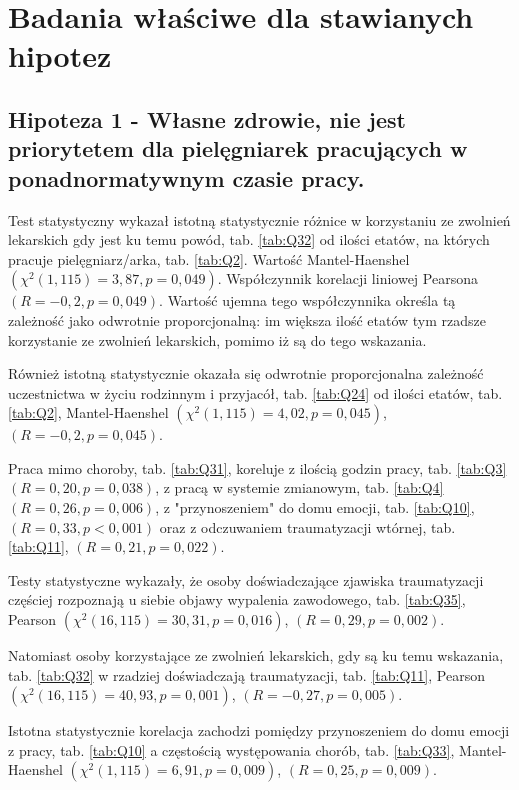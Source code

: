 \documentclass[a4paper,12pt,twoside,openright]{mwrep}
\begin{document}


\section*{Badania właściwe dla stawianych hipotez}


\subsection* {Hipoteza 1 - Własne zdrowie, nie jest priorytetem dla pielęgniarek pracujących w ponadnormatywnym czasie pracy.}


Test statystyczny wykazał istotną statystycznie różnice w korzystaniu ze zwolnień lekarskich gdy jest ku temu powód, tab. \ref{tab:Q32} od ilości etatów,  na których pracuje pielęgniarz/arka, tab. \ref{tab:Q2}. Wartość Mantel-Haenshel $(\chi^2 (1, 115) = 3,87, p=0,049)$. Współczynnik korelacji liniowej Pearsona $(R = -0,2, p=0,049)$. Wartość ujemna tego współczynnika określa tą zależność jako odwrotnie proporcjonalną: im większa ilość etatów tym rzadsze korzystanie ze zwolnień lekarskich, pomimo iż są do tego wskazania.

Również istotną statystycznie okazała się odwrotnie proporcjonalna zależność uczestnictwa w życiu rodzinnym i przyjacół, tab. \ref{tab:Q24} od ilości etatów, tab. \ref{tab:Q2}, Mantel-Haenshel $(\chi^2 (1, 115) = 4,02, p=0,045)$, $(R = -0,2, p = 0,045)$. 

Praca mimo choroby, tab. \ref{tab:Q31}, koreluje z ilością godzin pracy, tab. \ref{tab:Q3} $(R = 0,20, p = 0,038)$, z pracą w systemie zmianowym, tab. \ref{tab:Q4} $(R = 0,26, p = 0,006)$, z "przynoszeniem" do domu emocji, tab. \ref{tab:Q10}, $(R = 0,33, p < 0,001)$ oraz z odczuwaniem traumatyzacji wtórnej, tab. \ref{tab:Q11}, $(R = 0,21, p = 0,022)$.

Testy statystyczne wykazały, że osoby doświadczające zjawiska traumatyzacji częściej rozpoznają u siebie objawy wypalenia zawodowego, tab. \ref{tab:Q35}, 
Pearson $(\chi^2 (16, 115) = 30,31, p=0,016)$, $(R = 0,29, p = 0,002)$.


Natomiast osoby korzystające ze zwolnień lekarskich, gdy są ku temu wskazania, tab. \ref{tab:Q32} w rzadziej doświadczają traumatyzacji, tab. \ref{tab:Q11}, Pearson $(\chi^2 (16, 115) = 40,93, p=0,001)$, $(R = -0,27, p = 0,005)$.


Istotna statystycznie korelacja zachodzi pomiędzy przynoszeniem do domu emocji z pracy, tab. \ref{tab:Q10} a częstością występowania chorób, tab. \ref{tab:Q33}, Mantel-Haenshel $(\chi^2 (1, 115) = 6,91, p=0,009)$, $(R = 0,25, p = 0,009)$.
\end{document}
